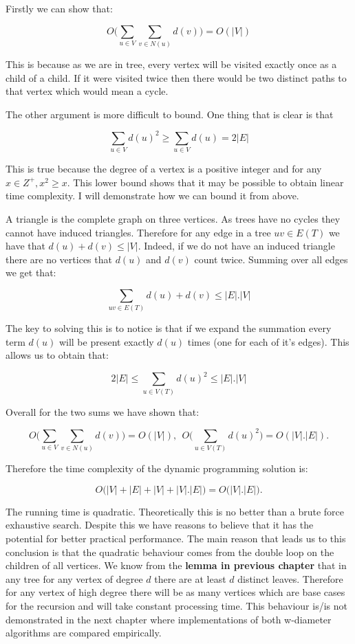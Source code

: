 Firstly we can show that:

$$ O\bigg( \sum_{u \in V}{\sum_{v \in N(u)}{d(v)}} \bigg) = O(|V|) $$

This is because as we are in tree, every vertex will be visited exactly once as a child of a child. If it were visited twice then there would be two distinct paths to that vertex which would mean a cycle. 

The other argument is more difficult to bound. One thing that is clear is that 

$$ \sum_{u \in V}{d(u)^2} \ge \sum_{u \in V}{d(u)} = 2|E|$$

This is true because the degree of a vertex is a positive integer and for any $x \in Z^+, x^2 \ge x$. This lower bound shows that it may be possible to obtain linear time complexity. I will demonstrate how we can bound it from above. 

A triangle is the complete graph on three vertices. As trees have no cycles they cannot have induced triangles. Therefore for any edge in a tree $uv \in E(T)$ we have that $d(u) + d(v) \le |V|$. Indeed, if we do not have an induced triangle there are no vertices that $d(u)$ and $d(v)$ count twice. Summing over all edges we get that:

$$ \sum_{uv \in E(T)}{d(u) + d(v)} \le |E|.|V| $$

The key to solving this is to notice is that if we expand the summation every term $d(u)$ will be present exactly $d(u)$ times (one for each of it's edges). This allows us to obtain that:

$$ 2|E| \le \sum_{u \in V(T)}{d(u)^2} \le |E|.|V| $$

Overall for the two sums we have shown that:

$$ O\bigg( \sum_{u \in V}{\sum_{v \in N(u)}{d(v)}} \bigg) = O(|V|)  , ~~ O\bigg( \sum_{u \in V(T)}{d(u)^2} \bigg) = O(|V|.|E|).$$

Therefore the time complexity of the dynamic programming solution is:

$$ O\big( |V| + |E| + |V| + |V|.|E|  \big) = O\big(|V|.|E|\big).$$


The running time is quadratic. Theoretically this is no better than a brute force exhaustive search. Despite this we have reasons to believe that it has the potential for better practical performance. The main reason that leads us to this conclusion is that the quadratic behaviour comes from the double loop on the children of all vertices. We know from the \textbf{lemma in previous chapter}  that in any tree for any vertex of degree $d$ there are at least $d$ distinct leaves. Therefore for any vertex of high degree there will be as many vertices which are base cases for the recursion and will take constant processing time. This behaviour is/is not demonstrated in the next chapter where implementations of both w-diameter algorithms are compared empirically.


\cite{parikh1980adaptive}
